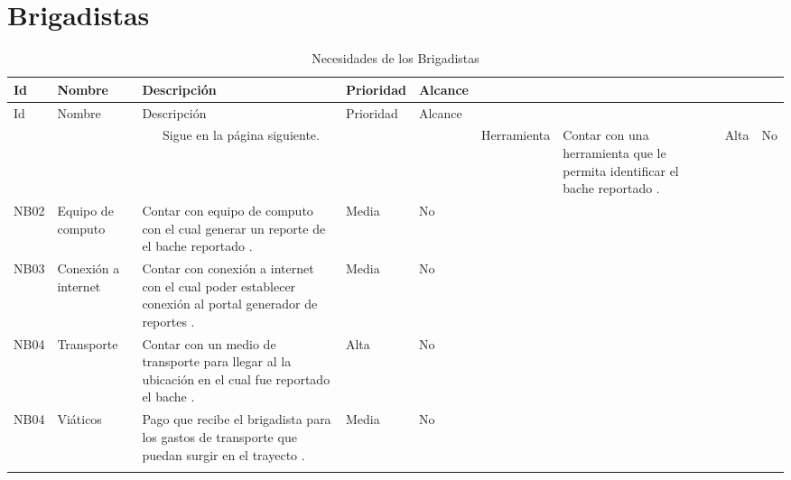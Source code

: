 \vspace{3cm}

\section {Brigadistas} 
\begin{longtable}{|m{1.5cm}|m{3cm}|m{5cm}|m{2cm}| m{2cm}|}
        \rowcolor[HTML]{3531FF} 
        {\color[HTML]{FFFFFF} Id} &{\color[HTML]{FFFFFF}Nombre} & {\color[HTML]{FFFFFF} Descripción} & {\color[HTML]{FFFFFF}Prioridad} & {\color[HTML]{FFFFFF}Alcance}  \\
        \hline
        \endfirsthead
        \hline
        Id & Nombre & Descripción & Prioridad & Alcance  \\
        \hline 
        \endhead
        \multicolumn{5}{c}{Sigue en la página siguiente.}
        \endfoot
        \endlastfoot
        NB01 & Herramienta & Contar con una herramienta que le permita identificar el bache reportado . & Alta  & No \\ \hline
        NB02 & Equipo de computo & Contar con equipo de computo con el cual generar un reporte de el bache reportado . & Media  & No \\ \hline
        NB03 & Conexión a internet  & Contar con conexión a internet con el cual poder establecer conexión al portal generador de reportes . & Media  & No \\ \hline
        NB04 & Transporte  & Contar con un medio de transporte para llegar al la ubicación en el cual fue reportado el bache . & Alta  & No \\ \hline
        NB04 & Viáticos  & Pago que recibe el brigadista para los gastos de transporte que puedan surgir en el trayecto . & Media  & No \\ \hline
    \caption{Necesidades de los Brigadistas}
    \label{tab:NBRs}
\end{longtable}

